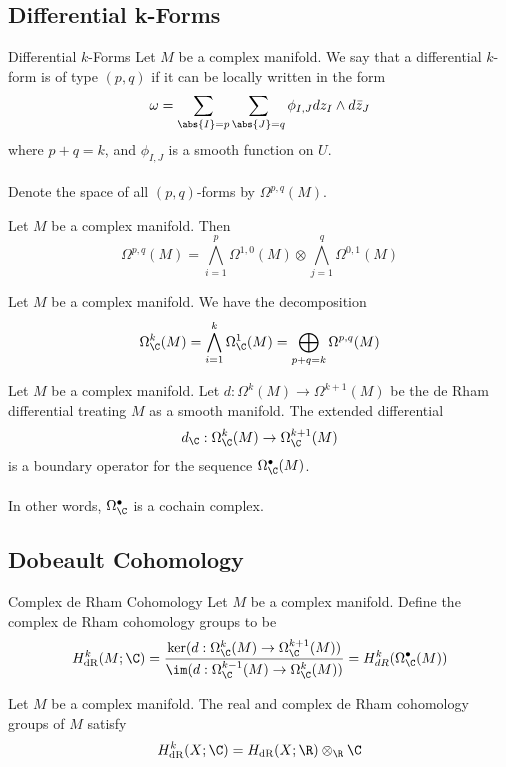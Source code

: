 \documentclass[a4paper]{article}
\begin{document}
\subsection{Differential k-Forms}
\begin{defn}{Differential $k$-Forms}{} Let $M$ be a complex manifold. We say that a differential $k$-form is of type $(p,q)$ if it can be locally written in the form $$\omega=\sum_{\abs{I}=p}\sum_{\abs{J}=q}\phi_{I,J}dz_I\wedge d\bar{z}_J$$ where $p+q=k$, and $\phi_{I,J}$ is a smooth function on $U$. \\~\\
Denote the space of all $(p,q)$-forms by $\Omega^{p,q}(M)$. 
\end{defn}

\begin{prp}{}{} Let $M$ be a complex manifold. Then $$\Omega^{p,q}(M)=\bigwedge_{i=1}^p\Omega^{1,0}(M)\otimes\bigwedge_{j=1}^q\Omega^{0,1}(M)$$
\end{prp}

\begin{lmm}{}{} Let $M$ be a complex manifold. We have the decomposition $$\Omega_{\C}^k(M)=\bigwedge_{i=1}^k\Omega_{\C}^1(M)=\bigoplus_{p+q=k}\Omega^{p,q}(M)$$
\end{lmm}

\begin{prp}{}{} Let $M$ be a complex manifold. Let $d:\Omega^k(M)\to\Omega^{k+1}(M)$ be the de Rham differential treating $M$ as a smooth manifold. The extended differential $$d_{\C}:\Omega_{\C}^k(M)\to\Omega_{\C}^{k+1}(M)$$ is a boundary operator for the sequence $\Omega_{\C}^\bullet(M)$. \\~\\
In other words, $\Omega_{\C}^\bullet$ is a cochain complex. 
\end{prp}

\subsection{Dobeault Cohomology}
\begin{defn}{Complex de Rham Cohomology}{} Let $M$ be a complex manifold. Define the complex de Rham cohomology groups to be $$H_{\text{dR}}^k(M;\C)=\frac{\ker(d:\Omega_{\C}^k(M)\to\Omega_{\C}^{k+1}(M))}{\im(d:\Omega_{\C}^{k-1}(M)\to\Omega_{\C}^k(M))}=H_{dR}^k(\Omega_{\C}^\bullet(M))$$
\end{defn}

\begin{prp}{}{} Let $M$ be a complex manifold. The real and complex de Rham cohomology groups of $M$ satisfy $$H_{\text{dR}}^k(X;\C)=H_{\text{dR}}(X;\R)\otimes_\R\C$$
\end{prp}
\end{document}
